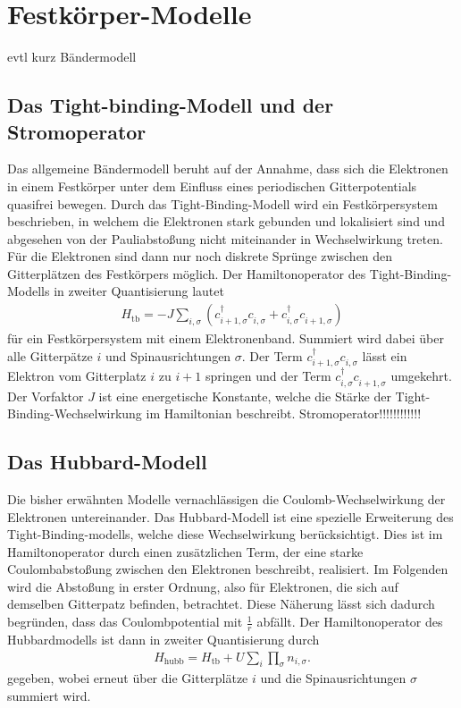 \chapter{Festkörper-Modelle}

evtl kurz Bändermodell

\section{Das Tight-binding-Modell und der Stromoperator}

Das allgemeine Bändermodell beruht auf der Annahme, dass sich die Elektronen in einem Festkörper unter dem Einfluss eines periodischen Gitterpotentials quasifrei bewegen.
Durch das Tight-Binding-Modell wird ein Festkörpersystem beschrieben, in welchem die Elektronen stark gebunden und lokalisiert sind und abgesehen von der Pauliabstoßung nicht miteinander in Wechselwirkung treten.
Für die Elektronen sind dann nur noch diskrete Sprünge zwischen den Gitterplätzen des Festkörpers möglich. Der Hamiltonoperator des Tight-Binding-Modells in zweiter Quantisierung lautet
\begin{align}
  H_\text{tb} = -J \sum_{i,\sigma} (c_{i+1,\sigma}^{\dag}c_{i,\sigma}^{\phantom{\dag}} + c_{i,\sigma}^{\dag}c_{i+1,\sigma}^{\phantom{\dag}})
  \label{eqn:hamiltontb}
\end{align}
für ein Festkörpersystem mit einem Elektronenband. Summiert wird dabei über alle Gitterpätze $i$ und Spinausrichtungen $\sigma$.
Der Term $c_{i+1,\sigma}^{\dag}c_{i,\sigma}^{\phantom{\dag}}$ lässt ein Elektron vom Gitterplatz $i$ zu $i+1$ springen und der Term $c_{i,\sigma}^{\dag}c_{i+1,\sigma}^{\phantom{\dag}}$ umgekehrt.
Der Vorfaktor $J$ ist eine energetische Konstante, welche die Stärke der Tight-Binding-Wechselwirkung im Hamiltonian beschreibt.
Stromoperator!!!!!!!!!!!!

\section{Das Hubbard-Modell}

Die bisher erwähnten Modelle vernachlässigen die Coulomb-Wechselwirkung der Elektronen untereinander.
Das Hubbard-Modell ist eine spezielle Erweiterung des Tight-Binding-modells, welche diese Wechselwirkung berücksichtigt.
Dies ist im Hamiltonoperator durch einen zusätzlichen Term, der eine starke Coulombabstoßung zwischen den Elektronen beschreibt, realisiert.
Im Folgenden wird die Abstoßung in erster Ordnung, also für Elektronen, die sich auf demselben Gitterpatz befinden, betrachtet.
Diese Näherung lässt sich dadurch begründen, dass das Coulombpotential mit $\frac1{r}$ abfällt. Der Hamiltonoperator des Hubbardmodells ist dann in zweiter Quantisierung durch
\begin{align}
  H_\text{hubb} = H_\text{tb} + U\sum_{i} \prod_{\sigma} n_{i,\sigma}.
  \label{eqn:hamiltonhubb}
\end{align}
gegeben, wobei erneut über die Gitterplätze $i$ und die Spinausrichtungen $\sigma$ summiert wird.

